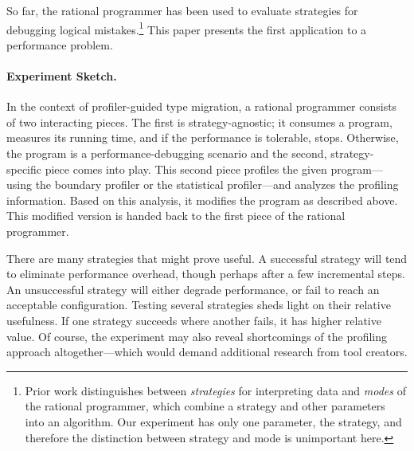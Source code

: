 So far, the rational programmer has been used to evaluate
strategies for debugging logical mistakes.\footnote{Prior work
distinguishes between \emph{strategies} for interpreting data and
\emph{modes} of the rational programmer, which combine a strategy and other
parameters into an algorithm. Our experiment has only one parameter, the
strategy, and therefore the distinction between strategy and mode is
unimportant here.}
This paper presents the first application to a performance problem.

\paragraph{Experiment Sketch.}
In the context of profiler-guided
type migration, a rational programmer consists of two interacting pieces.  The
first is strategy-agnostic; it consumes a program, measures its running time,
and if the performance is tolerable, stops. Otherwise, the program is a
performance-debugging scenario and the second,
strategy-specific piece comes into play. This second piece profiles the given program---using
the boundary profiler or the statistical profiler---and analyzes the
profiling information. Based on this analysis, it modifies the program
as described above.
This modified version is handed back
to the first piece of the rational programmer.

There are many strategies that might prove useful.
A successful strategy will tend to eliminate performance overhead,
though perhaps after a few incremental steps.
An unsuccessful strategy will either degrade performance, or fail
to reach an acceptable configuration.
Testing several strategies sheds light on their relative usefulness.
If one strategy succeeds where another fails, it has higher relative value.
Of course, the experiment may also reveal shortcomings of the profiling approach
altogether---which would demand additional research from tool creators.

